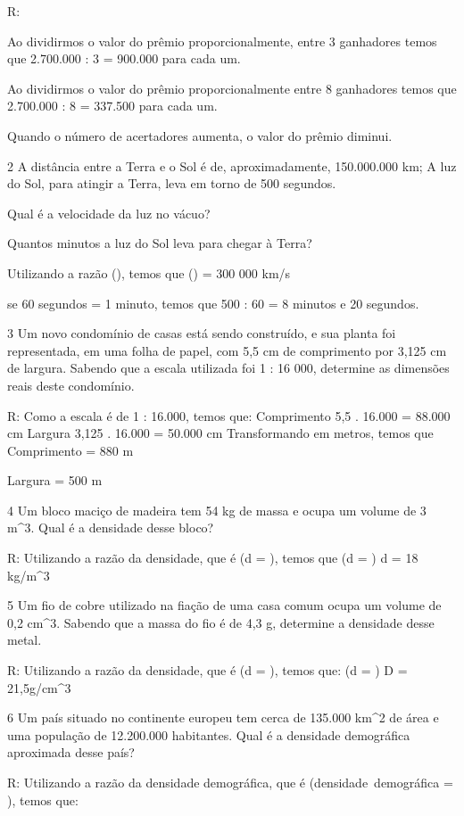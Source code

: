 {R:
\item Ao dividirmos o valor do prêmio proporcionalmente, entre 3 ganhadores
temos que 2.700.000 : 3 = 900.000 para cada um.
\item Ao dividirmos o valor do prêmio proporcionalmente entre 8 ganhadores
temos que 2.700.000 : 8 = 337.500 para cada um.
\item Quando o número de acertadores aumenta, o valor do prêmio diminui.

\num{2} A distância entre a Terra e o Sol é de, aproximadamente, 150.000.000
km; A luz do Sol, para atingir a Terra, leva em torno de 500 segundos.
\item Qual é a velocidade da luz no vácuo?
\item Quantos minutos a luz do Sol leva para chegar à Terra?
\item Utilizando a razão (), temos que
() = 300 000 km/s
\item se 60 segundos = 1 minuto, temos que 500 : 60 = 8 minutos e 20
segundos.

\num{3} Um novo condomínio de casas está sendo construído, e sua planta foi
representada, em uma folha de papel, com 5,5 cm de comprimento por 3,125
cm de largura. Sabendo que a escala utilizada foi 1 : 16 000, determine
as dimensões reais deste condomínio.

R: Como a escala é de 1 : 16.000, temos que:
Comprimento 5,5 . 16.000 = 88.000 cm
Largura 3,125 . 16.000 = 50.000 cm
Transformando em metros, temos que
Comprimento = 880 m

Largura = 500 m

\num{4} Um bloco maciço de madeira tem 54 kg de massa e ocupa um volume de 3
m^3. Qual é a densidade desse bloco?

R: Utilizando a razão da densidade, que é (d = ), temos que
(d = )
d = 18 kg/m^3

\num{5} Um fio de cobre utilizado na fiação de uma casa comum ocupa um volume
de 0,2 cm^3. Sabendo que a massa do fio é de 4,3 g, determine a densidade
desse metal.

R: Utilizando a razão da densidade, que é (d = ), temos que:
(d = )
D = 21,5g/cm^3

\num{6} Um país situado no continente europeu tem cerca de 135.000 km^2 de
área e uma população de 12.200.000 habitantes. Qual é a densidade
demográfica aproximada desse país?

R: Utilizando a razão da densidade demográfica, que é
(densidade\ demográfica = ),
temos que:

}
